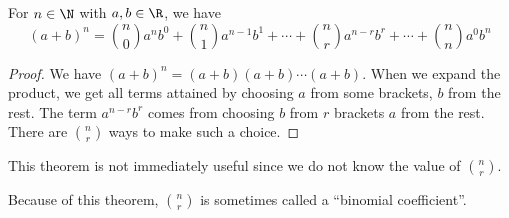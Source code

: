 \documentclass[a4paper]{article}
\begin{document}
  \begin{thm}
    For $n\in \N$ with $a, b\in \R$, we have
    \[
      (a + b)^n = {n\choose 0}a^n b^0 + {n\choose 1}a^{n-1}b^1 + \cdots + {n\choose r}a^{n - r}b^r + \cdots + {n\choose n}a^0b^n
    \]
  \end{thm}

  \begin{proof}
    We have $(a + b)^n = (a + b)(a + b)\cdots (a + b)$. When we expand the product, we get all terms attained by choosing $a$ from some brackets, $b$ from the rest. The term $a^{n - r}b^r$ comes from choosing $b$ from $r$ brackets $a$ from the rest. There are ${n\choose r}$ ways to make such a choice.
  \end{proof}
  \note This theorem is not immediately useful since we do not know the value of ${n \choose r}$.

  Because of this theorem, ${n \choose r}$ is sometimes called a ``binomial coefficient''.
\end{document}

